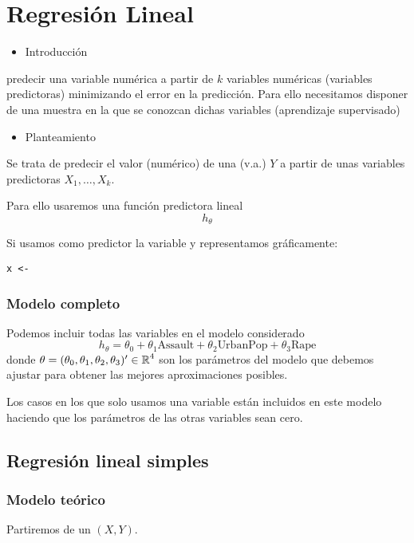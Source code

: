 \section{Regresión Lineal }
\begin{itemize}[label=\color{red}\textbullet, leftmargin=*]
	\item \color{lightblue}Introducción
\end{itemize}
 predecir una variable numérica a partir de $k$ variables numéricas (variables predictoras) minimizando el error en la predicción.
Para ello necesitamos disponer de una muestra en la que se conozcan dichas variables (aprendizaje supervisado)
\begin{itemize}[label=\color{red}\textbullet, leftmargin=*]
	\item \color{lightblue}Planteamiento
\end{itemize}
Se trata de predecir el valor (numérico) de una \va (v.a.) $Y$ a partir de unas variables predictoras $X_1,\dots,X_k$.

Para ello usaremos una función predictora lineal \[ h_\theta \]

Si usamos como predictor la variable  y representamos gráficamente:

\begin{lstlisting}
x <-
\end{lstlisting}
\subsubsection{Modelo completo}
Podemos incluir todas las variables en el modelo considerado \[ h_\theta=\theta_0+\theta_1\text{Assault}+\theta_2\text{UrbanPop}+\theta_3\text{Rape} \]donde $\theta=(\theta_0,\theta_1,\theta_2,\theta_3)'\in\operatorname{\mathbb{R}}^4$ son los parámetros del modelo que debemos ajustar para obtener las mejores aproximaciones posibles.

Los casos en los que solo usamos una variable están incluidos en este modelo haciendo que los parámetros de las otras variables sean cero.

\subsection{Regresión lineal simples}
\subsubsection{Modelo teórico}
Partiremos de un \vea $(X,Y)$.

